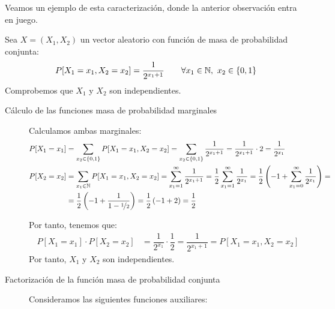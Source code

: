 Veamos un ejemplo de esta caracterización, donde la anterior observación entra en juego.
\begin{ejemplo}
    Sea $X=(X_1,X_2)$ un vector aleatorio con función de masa de probabilidad conjunta:
    \begin{equation*}
        P[X_1=x_1,X_2=x_2]=\dfrac{1}{2^{x_1+1}}
        \qquad \forall x_1\in \mathbb{N},~x_2\in \{0,1\}
    \end{equation*}
    Comprobemos que $X_1$ y $X_2$ son independientes.\\

    \begin{description}
        \item[Cálculo de las funciones masa de probabilidad marginales]
        
        Calculamos ambas marginales:
        \begin{align*}
            P[X_1=x_1] &= \sum_{x_2\in \{0,1\}} P[X_1=x_1,X_2=x_2] = \sum_{x_2\in \{0,1\}} \dfrac{1}{2^{x_1+1}} = \dfrac{1}{2^{x_1+1}}\cdot 2 = \dfrac{1}{2^{x_1}} \\
            P[X_2=x_2] &= \sum_{x_1\in \mathbb{N}} P[X_1=x_1,X_2=x_2] = \sum_{x_1=1}^{\infty} \dfrac{1}{2^{x_1+1}} 
            =\dfrac{1}{2}\sum_{x_1=1}^{\infty} \dfrac{1}{2^{x_1}}
            =\dfrac{1}{2}\left(-1+\sum_{x_1=0}^{\infty} \dfrac{1}{2^{x_1}}\right)
            =\\&=\dfrac{1}{2}\left(-1+\dfrac{1}{1-\nicefrac{1}{2}}\right)
            = \dfrac{1}{2}\left(-1+2\right) = \dfrac{1}{2}
        \end{align*}

        Por tanto, tenemos que:
        \begin{align*}
            P[X_1=x_1]\cdot P[X_2=x_2] &= \dfrac{1}{2^{x_1}}\cdot \dfrac{1}{2} = \dfrac{1}{2^{x_1+1}} = P[X_1=x_1,X_2=x_2]
        \end{align*}
        Por tanto, $X_1$ y $X_2$ son independientes.

        \item[Factorización de la función masa de probabilidad conjunta]
        
        Consideramos las siguientes funciones auxiliares:
    

\end{description}
\end{ejemplo}
